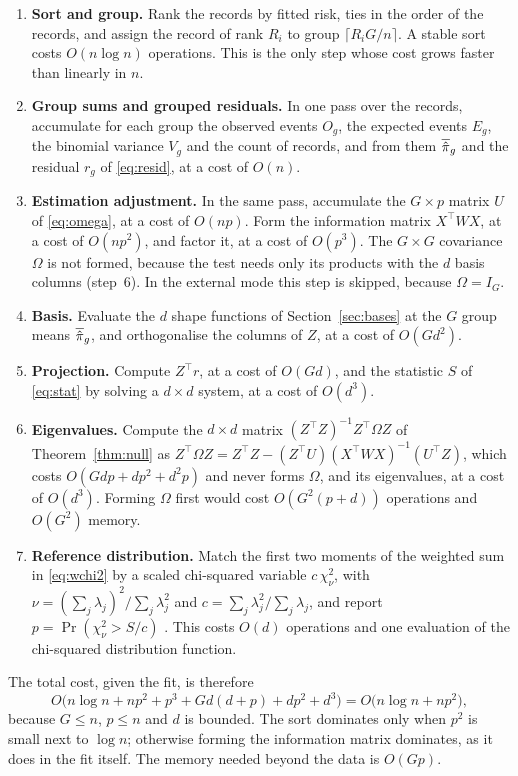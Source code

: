 \begin{enumerate}
\item \textbf{Sort and group.} Rank the records by fitted risk, ties in the order of the records, and
assign the record of rank $R_i$ to group $\lceil R_iG/n\rceil$. A stable sort costs $O(n\log n)$
operations. This is the only step whose cost grows faster than linearly in $n$.
\item \textbf{Group sums and grouped residuals.} In one pass over the records, accumulate for each
group the observed events $O_g$, the expected events $E_g$, the binomial variance $V_g$ and the count
of records, and from them $\overline{\hat{\pi}}_g$ and the residual $r_g$ of \eqref{eq:resid}, at a cost of $O(n)$.
\item \textbf{Estimation adjustment.} In the same pass, accumulate the $G\times p$ matrix $U$ of
\eqref{eq:omega}, at a cost of $O(np)$. Form the information matrix $X^\top WX$, at a cost of $O(np^2)$,
and factor it, at a cost of $O(p^3)$. The $G\times G$ covariance $\Omega$ is not formed, because the
test needs only its products with the $d$ basis columns (step~6). In the external mode this step is
skipped, because $\Omega=I_G$.
\item \textbf{Basis.} Evaluate the $d$ shape functions of Section~\ref{sec:bases} at the $G$ group
means $\overline{\hat{\pi}}_g$, and orthogonalise the columns of $Z$, at a cost of $O(Gd^2)$.
\item \textbf{Projection.} Compute $Z^\top r$, at a cost of $O(Gd)$, and the statistic $S$ of
\eqref{eq:stat} by solving a $d\times d$ system, at a cost of $O(d^3)$.
\item \textbf{Eigenvalues.} Compute the $d\times d$ matrix $(Z^\top Z)^{-1}Z^\top\Omega Z$ of
Theorem~\ref{thm:null} as $Z^\top\Omega Z=Z^\top Z-(Z^\top U)(X^\top WX)^{-1}(U^\top Z)$, which costs
$O(Gdp+dp^2+d^2p)$ and never forms $\Omega$, and its eigenvalues, at a cost of $O(d^3)$. Forming $\Omega$
first would cost $O(G^2(p+d))$ operations and $O(G^2)$ memory.
\item \textbf{Reference distribution.} Match the first two moments of the weighted sum in
\eqref{eq:wchi2} by a scaled chi-squared variable $c\,\chi^2_\nu$, with
$\nu=(\sum_j\lambda_j)^2/\sum_j\lambda_j^2$ and $c=\sum_j\lambda_j^2/\sum_j\lambda_j$, and report
$p=\Pr(\chi^2_\nu>S/c)$ \citep{satterthwaite1946}. This costs $O(d)$ operations and one evaluation of
the chi-squared distribution function.
\end{enumerate}

The total cost, given the fit, is therefore
\[
O\bigl(n\log n+np^2+p^3+Gd(d+p)+dp^2+d^3\bigr)=O\bigl(n\log n+np^2\bigr),
\]
because $G\le n$, $p\le n$ and $d$ is bounded. The sort dominates only when $p^2$ is small next to
$\log n$; otherwise forming the information matrix dominates, as it does in the fit itself. The memory
needed beyond the data is $O(Gp)$.

